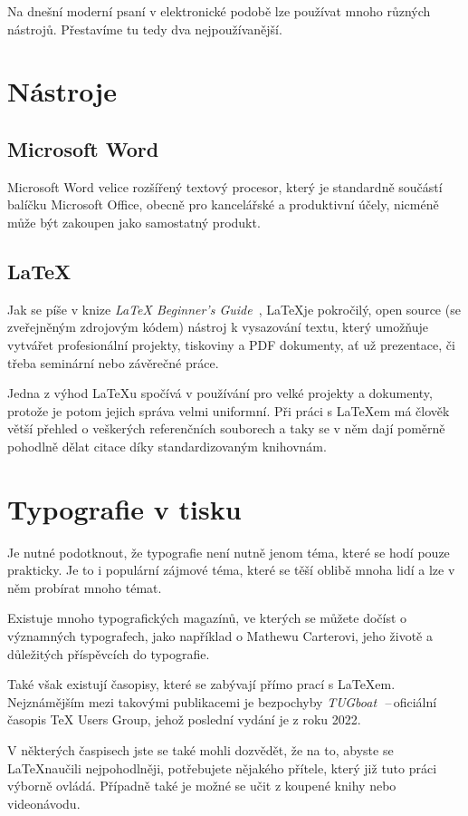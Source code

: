 \documentclass[11pt, a4paper]{article}
\begin{document}
Na dnešní moderní psaní v elektronické podobě lze používat mnoho různých nástrojů. Přestavíme tu tedy dva nejpoužívanější.

\section{Nástroje}

\subsection{Microsoft Word}
Microsoft Word velice rozšířený textový procesor, který je standardně součástí balíčku Microsoft Office, obecně pro kancelářské a produktivní účely, nicméně může být zakoupen jako samostatný produkt.~\cite{Rouse2022}

\subsection{\LaTeX}
Jak se píše v knize \textit{LaTeX Beginner's Guide}~\cite{Kottwitz2011}, \LaTeX je pokročilý, open source (se zveřejněným zdrojovým kódem) nástroj k vysazování textu, který umožňuje vytvářet profesionální projekty, tiskoviny a PDF dokumenty, ať už prezentace, či třeba seminární nebo závěrečné práce.

Jedna z výhod \LaTeX u spočívá v používání pro velké projekty a dokumenty, protože je potom jejich správa velmi uniformní. Při práci s \LaTeX em má člověk větší přehled o veškerých referenčních souborech a taky se v něm dají poměrně pohodlně dělat citace díky standardizovaným knihovnám.~\cite{Sokol2012}

\section{Typografie v tisku}

Je nutné podotknout, že typografie není nutně jenom téma, které se hodí pouze prakticky. Je to i populární zájmové téma, které se těší oblibě mnoha lidí a lze v něm probírat mnoho témat.

Existuje mnoho typografických magazínů, ve kterých se můžete dočíst o významných typografech, jako například o Mathewu Carterovi, jeho životě a důležitých příspěvcích do typografie.~\cite{Blazek2005}

Také však existují časopisy, které se zabývají přímo prací s \LaTeX em. Nejznámějším mezi takovými publikacemi je bezpochyby \textit{TUGboat}~\cite{TUGboat2022}\,--\,oficiální časopis TeX Users Group, jehož poslední vydání je z roku 2022.

V některých časpisech jste se také mohli dozvědět, že na to, abyste se \LaTeX naučili nejpohodlněji, potřebujete nějakého přítele, který již tuto práci výborně ovládá. Případně také je možné se učit z koupené knihy nebo videonávodu.~\cite{Gratzer2008}

\newpage


\renewcommand{\refname}{Použitá Literatura}

\end{document}
